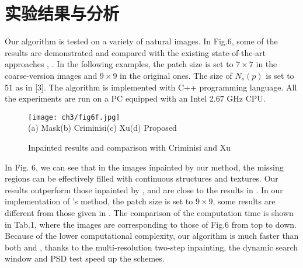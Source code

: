  \section{实验结果与分析}
 \label{cha3:results}
Our algorithm is tested on a variety of natural images. In Fig.6, some of the results are demonstrated and compared with the existing state-of-the-art approaches \cite{Criminisi04regionfilling}, \cite{Xu:2010}. In the following examples, the patch size is set to \(7\times7\) in the coarse-version images and \(9\times9\) in the original ones. The size of \(N_s(p)\) is set to 51 as in [3]. The algorithm is implemented with C++ programming language. All the experiments are run on a PC equipped with an Intel 2.67 GHz CPU.\par
\begin{figure*}[!htbp]
\begin{center}
  \texttt{[image: ch3/fig6f.jpg]}\\
  (a) Mask\quad\quad\quad\quad\quad\quad(b) Criminisi\cite{Criminisi04regionfilling}\quad\quad\quad\quad\quad\quad(c) Xu\cite{Xu:2010}\quad\quad\quad\quad\quad\quad(d) Proposed
\end{center}
\caption{Inpainted results and comparison with Criminisi\cite{Criminisi04regionfilling} and Xu\cite{Xu:2010}}
\label{fig:6}       %
\end{figure*}
In Fig. 6, we can see that in the images inpainted by our method, the missing regions can be effectively filled with continuous structures and textures. Our results outperform those inpainted by \cite{Criminisi04regionfilling}, and are close to the results in \cite{Xu:2010}. In our implementation of \cite{Criminisi04regionfilling}'s method, the patch size is set to \(9\times9\), some results are different from those given in \cite{Xu:2010}. The comparison of the computation time is shown in Tab.1, where the images are corresponding to those of Fig.6 from top to down. Because of the lower computational complexity, our algorithm is much faster than both \cite{Criminisi04regionfilling} and \cite{Xu:2010}, thanks to the multi-resolution two-step inpainting, the dynamic search window and PSD test speed up the schemes.
